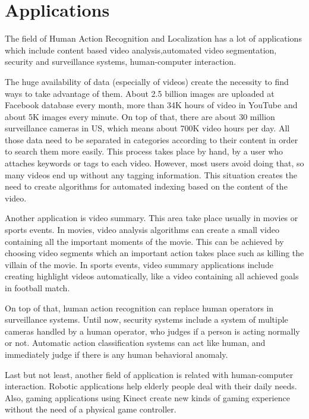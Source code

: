 \section{Applications}
The field of Human Action Recognition and Localization has a lot of applications which include 
 content based video analysis,automated video segmentation, security and surveillance systems,
human-computer interaction.

The huge availability of data (especially of videos) create the  necessity to find ways to take advantage of them.
About 2.5 billion images are uploaded at Facebook database every month, more than 34K hours of video in YouTube and
about 5K images every minute. On top of that, there are about 30 million surveillance cameras in US, which means
about 700K video hours per day. All those data need to be separated in categories according to their content in
order to search them more easily. This process takes place by hand, by a user who attaches
keywords or tags to each video. However, most users avoid doing that, so many videos end up without any tagging information.
This situation creates the need to create algorithms for automated indexing based on the content of the video.

Another application is video summary. This area take place usually in movies or sports events. In movies,
video analysis algorithms can create a small video containing all the important moments of the movie. This
can be achieved by choosing video segments which an important action takes place such as killing the villain
of the movie. In sports events, video summary applications include creating highlight videos automatically, like
a video containing all achieved goals in football match.

On top of that, human action recognition can replace human operators in surveillance systems. Until now,
security systems include a system of multiple cameras handled by a human operator, who judges if a person
is acting normally or not. Automatic action classification systems can act like human, and immediately
judge if there is any human behavioral anomaly.

Last but not least, another field of application is related with human-computer interaction. Robotic applications
help elderly people deal with their daily needs. Also, gaming applications using Kinect create new kinds of
gaming experience without the need of a physical game controller.

